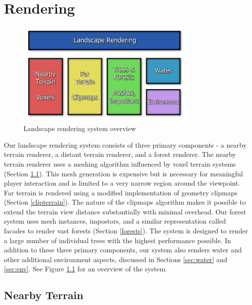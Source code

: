 
\chapter{Rendering}

\begin{figure}
  \centering
    \includegraphics[width=0.8\textwidth]{figures/RenderSystem}
  \caption{Landscape rendering system overview}
  \label{fig:renderoverview}
\end{figure}


Our landscape rendering system consists of three primary components - a nearby terrain renderer, a distant terrain renderer, and a forest renderer.
The nearby terrain renderer uses a meshing algorithm influenced by voxel terrain systems (Section \ref{voxterrain}).
This mesh generation is expensive but is necessary for meaningful player interaction and is limited to a very narrow region around the viewpoint.
Far terrain is rendered using a modified implementation of geometry clipmaps (Section \ref{clipterrain}).
The nature of the clipmaps algorithm makes it possible to extend the terrain view distance substantially with minimal overhead.
Our forest system uses mesh instances, impostors, and a similar representation called facades to render vast forests (Section \ref{forests}).
The system is designed to render a large number of individual trees with the highest performance possible.
In addition to these three primary components, our system also renders water and other additional environment aspects, discussed in Sections \ref{sec:water} and \ref{sec:env}.
See Figure \ref{fig:renderoverview} for an overview of the system.

\section{Nearby Terrain} \label{voxterrain} %

